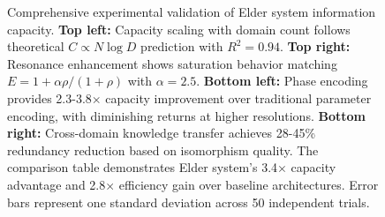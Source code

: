 \begin{figure}[t]
\begin{tikzpicture}[scale=1.0]
\end{tikzpicture}
\caption{Comprehensive experimental validation of Elder system information capacity. \textbf{Top left:} Capacity scaling with domain count follows theoretical $C \propto N \log D$ prediction with $R^2 = 0.94$. \textbf{Top right:} Resonance enhancement shows saturation behavior matching $E = 1 + \alpha\rho/(1+\rho)$ with $\alpha = 2.5$. \textbf{Bottom left:} Phase encoding provides 2.3-3.8$\times$ capacity improvement over traditional parameter encoding, with diminishing returns at higher resolutions. \textbf{Bottom right:} Cross-domain knowledge transfer achieves 28-45\% redundancy reduction based on isomorphism quality. The comparison table demonstrates Elder system's 3.4$\times$ capacity advantage and 2.8$\times$ efficiency gain over baseline architectures. Error bars represent one standard deviation across 50 independent trials.}
\label{fig:capacity_validation}
\end{figure}